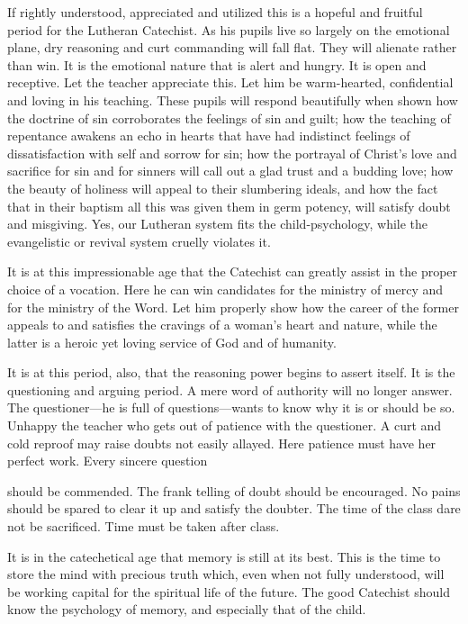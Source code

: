 If rightly understood, appreciated and utilized this is a hopeful and fruitful period for the Lutheran Catechist. As his pupils live so largely on the emotional plane, dry reasoning and curt commanding will fall flat. They will alienate rather than win. It is the emotional nature that is alert and hungry. It is open and receptive. Let the teacher appreciate this. Let him be warm-hearted, confidential and loving in his teaching. These pupils will respond beautifully when shown how the doctrine of sin corroborates the feelings of sin and guilt; how the teaching
of repentance awakens an echo in hearts that have had indistinct feelings of dissatisfaction with self and sorrow for sin; how the portrayal of Christ’s love and sacrifice for sin and for sinners will call out a glad trust and a budding love; how the beauty of holiness will appeal to their slumbering ideals, and how the fact that in their baptism all this was given them in germ potency, will satisfy doubt and misgiving. Yes, our Lutheran system fits the child-psychology, while the evangelistic or revival system cruelly violates it.

It is at this impressionable age that the Catechist can greatly assist in the proper choice of a vocation. Here he can win candidates for the ministry of mercy and for the ministry of the Word. Let him properly show how the career of the former appeals to and satisfies the cravings of a woman’s heart and nature, while the latter is a heroic yet loving service of God and of humanity.

It is at this period, also, that the reasoning power begins to assert itself. It is the questioning and arguing period. A mere word of authority will no longer answer. The questioner—he is full of questions—wants to know why it is or should be so. Unhappy the teacher who gets out of patience with the questioner. A curt and cold reproof may raise doubts not easily allayed. Here patience must have her perfect work. Every sincere question

should be commended. The frank telling of doubt should be encouraged. No pains should be spared to clear it up and satisfy the doubter. The time of the class dare not be sacrificed. Time must be taken after class.

It is in the catechetical age that memory is still at its best. This is the time to store the mind with precious truth which, even when not fully understood, will be working capital for the spiritual life of the future. The good Catechist should know the psychology of memory, and especially that of the child.

